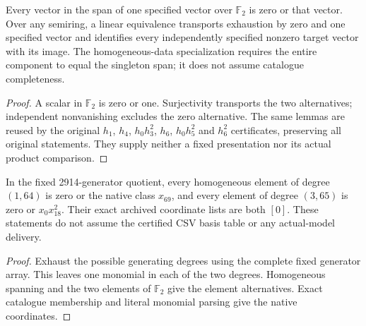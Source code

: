 \begin{lemma}
  \label{lem:lin-singleton-exhaustion-transport}
  \leanok
  Every vector in the span of one specified vector over $\mathbb F_2$ is
  zero or that vector. Over any semiring, a linear equivalence transports
  exhaustion by zero and one specified vector and identifies every
  independently specified nonzero target vector with its image.
  The homogeneous-data specialization requires the entire component to
  equal the singleton span; it does not assume catalogue completeness.
\end{lemma}
\begin{proof}
  \leanok
  A scalar in $\mathbb F_2$ is zero or one. Surjectivity transports the two
  alternatives; independent nonvanishing excludes the zero alternative.
  The same lemmas are reused by the original $h_1$, $h_4$, $h_0h_3^2$,
  $h_6$, $h_0h_5^2$ and $h_6^2$ certificates, preserving all original statements.
  They supply neither a fixed presentation nor its actual product comparison.
\end{proof}

\begin{lemma}
  \label{lem:lin-h6-one-line-coordinate-certificate}
  \leanok
  In the fixed 2914-generator quotient, every homogeneous element of
  degree $(1,64)$ is zero or the native class $x_{69}$, and every element
  of degree $(3,65)$ is zero or $x_0x_{18}^2$. Their exact archived
  coordinate lists are both $[0]$. These statements do not assume the
  certified CSV basis table or any actual-model delivery.
\end{lemma}
\begin{proof}
  \leanok
  Exhaust the possible generating degrees using the complete fixed
  generator array. This leaves one monomial in each of the two degrees.
  Homogeneous spanning and the two elements of $\mathbb F_2$ give the
  element alternatives. Exact catalogue membership and literal monomial
  parsing give the native coordinates.
\end{proof}

